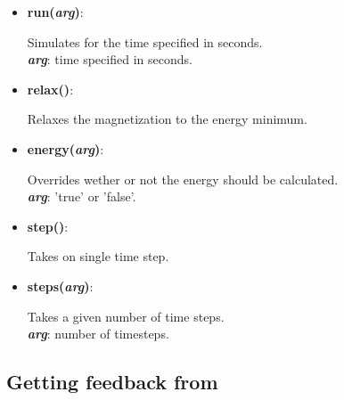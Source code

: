 \begin{itemize}

 \item {\textbf{run(\textit{arg})}:
				\flushright\parbox{0.9 \textwidth}{\vspace{-0.25cm} 
				Simulates for the time specified in seconds.\\
				\textbf{\textit{arg}}: time specified in seconds.
				}\flushleft}

 \item {\vspace{-0.4cm}\textbf{relax()}:
				\flushright\parbox{0.9 \textwidth}{\vspace{-0.25cm} 
				Relaxes the magnetization to the energy minimum.
				}\flushleft}

 \item {\vspace{-0.4cm}\textbf{energy(\textit{arg})}:
				\flushright\parbox{0.9 \textwidth}{\vspace{-0.25cm} 
				Overrides wether or not the energy should be calculated.\\
				\textbf{\textit{arg}}: 'true' or 'false'.
				}\flushleft}

 \item {\vspace{-0.4cm}\textbf{step()}:
				\flushright\parbox{0.9 \textwidth}{\vspace{-0.25cm} 
				Takes on single time step.
				}\flushleft}

 \item {\vspace{-0.4cm}\textbf{steps(\textit{arg})}:
				\flushright\parbox{0.9 \textwidth}{\vspace{-0.25cm} 
				Takes a given number of time steps.\\
				\textbf{\textit{arg}}: number of timesteps.
				}\flushleft}

\end{itemize}


\subsection{Getting feedback from \mumax}

